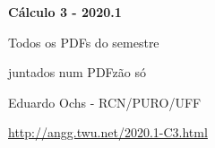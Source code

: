 \documentclass[oneside,12pt]{article}
\begin{document}

\def\drafturl{http://angg.twu.net/LATEX/2020-1-C3.pdf}
\def\drafturl{http://angg.twu.net/2020.1-C3.html}
\def\draftfooter{\tiny \href{\drafturl}{\jobname{}} \ColorBrown{\shorttoday{} \hours}}



%

\thispagestyle{empty}

\begin{center}

\vspace*{1.2cm}

{\bf \Large Cálculo 3 - 2020.1}

\bsk

Todos os PDFs do semestre

juntados num PDFzão só

\bsk

Eduardo Ochs - RCN/PURO/UFF

\url{http://angg.twu.net/2020.1-C3.html}

\end{center}

\newpage

\def\incl#1{}

\incl{2020-1-C3-intro}

\incl{2020-1-C3-vetor-tangente}

\incl{2020-1-C3-taylor-1}

\incl{2020-1-C3-taylor-2}

\incl{2020-1-C3-taylor-3}

\incl{2020-1-C3-superficies-1}

\incl{2020-1-C3-superficies-2}
\end{document}
